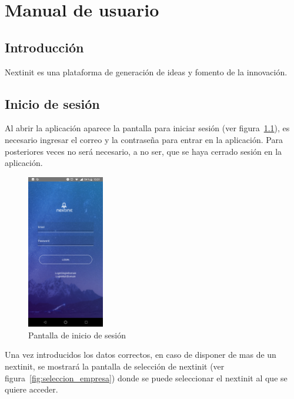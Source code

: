 \chapter{Manual de usuario}

\section{Introducción}

Nextinit es una plataforma de generación de ideas y fomento de la innovación. 

\section{Inicio de sesión}

Al abrir la aplicación aparece la pantalla para iniciar sesión (ver figura~\ref{fig:login}), es 
necesario ingresar el correo y la contraseña para entrar en la aplicación. Para posteriores 
veces no será necesario, a no ser, que se haya cerrado sesión en la aplicación.

\begin{figure}[!h]
	\begin{center}
		\includegraphics[width=0.3\textwidth]{./img/anexo1/login.png}
		\caption{Pantalla de inicio de sesión}
		\label{fig:login}
	\end{center}
\end{figure}

Una vez introducidos los datos correctos, en caso de disponer de mas de un nextinit,
se mostrará la pantalla de selección de nextinit (ver figura~\ref{fig:seleccion_empresa}) 
donde se puede seleccionar el nextinit al que se quiere acceder.

